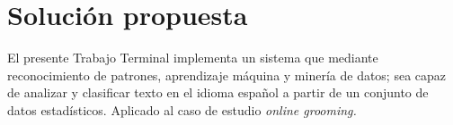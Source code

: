 \section{Soluci\'on propuesta}
El presente Trabajo Terminal implementa un sistema que mediante reconocimiento de patrones, aprendizaje m\'aquina y miner\'ia de datos; sea capaz de analizar y clasificar texto en el idioma espa\~nol a partir de un conjunto de datos estad\'isticos. Aplicado al caso de estudio \textit{online grooming.}

